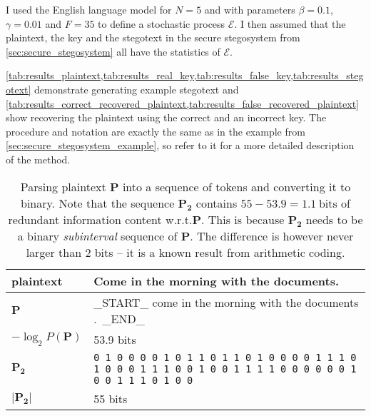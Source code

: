 \documentclass[draft]{IIBproject}
\makeatletter
\DeclareRobustCommand*{\wrt}{w.r.t.\@\xspace}
\makeatother
\begin{document}
I used the English language model for $N = 5$ and with parameters $\beta = 0.1$, $\gamma = 0.01$ and $F = 35$ to define a stochastic process $\mathcal E$. I then assumed that the plaintext, the key and the stegotext in the secure stegosystem from \cref{sec:secure_stegosystem} all have the statistics of $\mathcal E$.

\cref{tab:results_plaintext,tab:results_real_key,tab:results_false_key,tab:results_stegotext} demonstrate generating example stegotext and \cref{tab:results_correct_recovered_plaintext,tab:results_false_recovered_plaintext} show recovering the plaintext using the correct and an incorrect key. The procedure and notation are exactly the same as in the example from \cref{sec:secure_stegosystem_example}, so refer to it for a more detailed description of the method.

\renewcommand{\arraystretch}{1.25}

\begin{table}[h]
	\centering
	\begin{tabular}{m{3cm} m{12cm}}
	\centering plaintext & Come in the morning with the documents. \\ \hline
	\centering $\mathbf P$ & \_START\_ come in the morning with the documents .\ \_END\_ \\ \hline
	\centering $-\log_2 P(\mathbf P)$ & 53.9 bits \\ \hline
	\centering $\mathbf{P_2}$ & \footnotesize \texttt{0 1 0 0 0 0 1 0 1 1 0 1 1 0 1 0 0 0 0 1 1 1 0 1 0 0 0 1 1 1 0 0 1 0 0 1 1 1 1 0 0 0 0 0 0 1 0 0 1 1 1 0 1 0 0} \\ \hline
	\centering $| \mathbf{P_2} |$ & 55 bits
	\end{tabular}
	\caption{\label{tab:results_plaintext}Parsing plaintext $\mathbf P$ into a sequence of tokens and converting it to binary. Note that the sequence $\mathbf{P_2}$ contains $55 - 53.9 = 1.1~\text{bits}$ of redundant information content \wrt $\mathbf P$. This is because $\mathbf{P_2}$ needs to be a binary \emph{subinterval} sequence of $\mathbf P$. The difference is however never larger than 2 bits -- it is a known result from arithmetic coding.}
\end{table}
\end{document}

